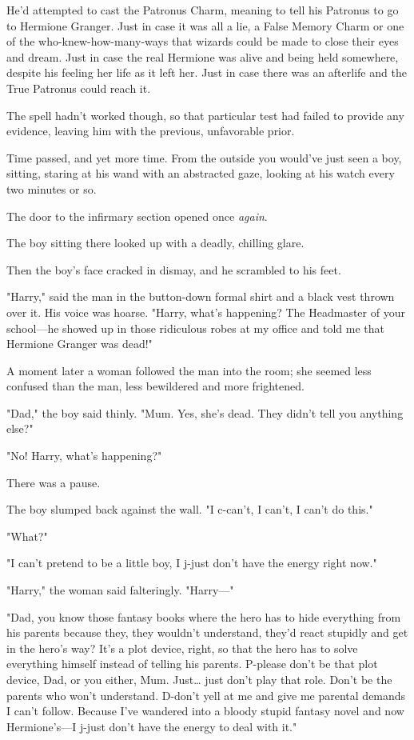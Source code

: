 He'd attempted to cast the Patronus Charm, meaning to tell his Patronus to go 
to Hermione Granger. Just in case it was all a lie, a False Memory Charm or one 
of the who-knew-how-many-ways that wizards could be made to close their eyes 
and dream. Just in case the real Hermione was alive and being held somewhere, 
despite his feeling her life as it left her. Just in case there was an 
afterlife and the True Patronus could reach it.

The spell hadn't worked though, so that particular test had failed to provide 
any evidence, leaving him with the previous, unfavorable prior.

Time passed, and yet more time. From the outside you would've just seen a boy, 
sitting, staring at his wand with an abstracted gaze, looking at his watch 
every two minutes or so.

The door to the infirmary section opened once \emph{again}.

The boy sitting there looked up with a deadly, chilling glare.

Then the boy's face cracked in dismay, and he scrambled to his feet.

"Harry," said the man in the button-down formal shirt and a black vest thrown 
over it. His voice was hoarse. "Harry, what's happening? The Headmaster of your 
school---he showed up in those ridiculous robes at my office and told me that 
Hermione Granger was dead!"

A moment later a woman followed the man into the room; she seemed less confused 
than the man, less bewildered and more frightened.

"Dad," the boy said thinly. "Mum. Yes, she's dead. They didn't tell you 
anything else?"

"No! Harry, what's happening?"

There was a pause.

The boy slumped back against the wall. "I c-can't, I can't, I can't do this."

"What?"

"I can't pretend to be a little boy, I j-just don't have the energy right now."

"Harry," the woman said falteringly. "Harry---"

"Dad, you know those fantasy books where the hero has to hide everything from 
his parents because they, they wouldn't understand, they'd react stupidly and 
get in the hero's way? It's a plot device, right, so that the hero has to solve 
everything himself instead of telling his parents. P-please don't be that plot 
device, Dad, or you either, Mum. Just{\ldots} just don't play that role. Don't 
be the parents who won't understand. D-don't yell at me and give me parental 
demands I can't follow. Because I've wandered into a bloody stupid fantasy 
novel and now Hermione's---I j-just don't have the energy to deal with it."

